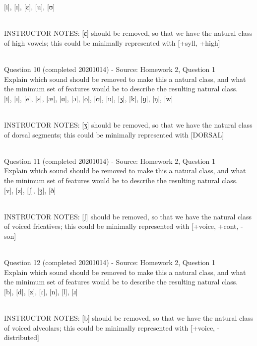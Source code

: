\documentclass[12pt]{article}
\begin{document}
{[i]}, {[ɪ]}, {[ɛ]}, {[u]}, {[ʊ]}


~\\
INSTRUCTOR NOTES: [ɛ] should be removed, so that we have the natural class of high vowels; this could be minimally represented with [+syll, +high]


~\\

{\large Question 10} (completed 20201014) - Source: Homework 2, Question 1\\

Explain which sound should be removed to make this a natural class, and what the minimum set of features would be to describe the resulting natural class.\\

{[i]}, {[ɪ]}, {[e]}, {[ɛ]}, {[æ]}, {[ɑ]}, {[ɔ]}, {[o]}, {[ʊ]}, {[u]}, {[ʒ]}, {[k]}, {[ɡ]}, {[ŋ]}, {[w]}


~\\
INSTRUCTOR NOTES: [ʒ] should be removed, so that we have the natural class of dorsal segments; this could be minimally represented with [DORSAL]


~\\

{\large Question 11} (completed 20201014) - Source: Homework 2, Question 1\\

Explain which sound should be removed to make this a natural class, and what the minimum set of features would be to describe the resulting natural class.\\

{[v]}, {[z]}, {[ʃ]}, {[ʒ]}, {[ð]}


~\\
INSTRUCTOR NOTES: [ʃ] should be removed, so that we have the natural class of voiced fricatives; this could be minimally represented with [+voice, +cont, -son]


~\\

{\large Question 12} (completed 20201014) - Source: Homework 2, Question 1\\

Explain which sound should be removed to make this a natural class, and what the minimum set of features would be to describe the resulting natural class.\\

{[b]}, {[d]}, {[z]}, {[ɾ]}, {[n]}, {[l]}, {[ɹ]}


~\\
INSTRUCTOR NOTES: [b] should be removed, so that we have the natural class of voiced alveolars; this could be minimally represented with [+voice, -distributed]
\end{document}
